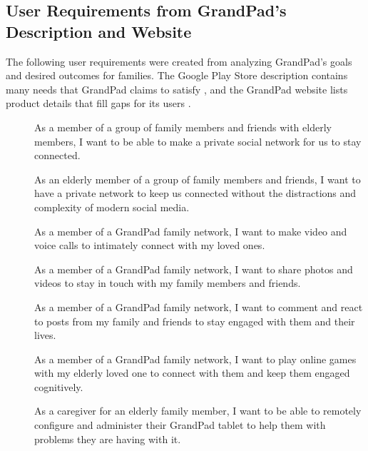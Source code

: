 \subsection*{User Requirements from GrandPad's Description and Website}

The following user requirements were created from analyzing GrandPad's goals and
    desired outcomes for families.
The Google Play Store description contains many needs that GrandPad claims to
    satisfy \cite{grandpad_google_play}, and the GrandPad website lists
    product details that fill gaps for its users \cite{grandpad_product_details}.

\begin{description}
    \item[\textbf{\showusernetcounter}]
        As a member of a group of family members and friends with elderly
            members, I want to be able to make a private social network for us
            to stay connected.
    \item[\textbf{\showusernetcounter}]
        As an elderly member of a group of family members and friends, I want to
            have a private network to keep us connected without the distractions
            and complexity of modern social media.
    \item[\textbf{\showusercallcounter}]
        As a member of a GrandPad family network, I want to make video and voice
            calls to intimately connect with my loved ones.
    \item[\textbf{\showuserpostcounter}]
        As a member of a GrandPad family network, I want to share photos and
            videos to stay in touch with my family members and friends.
    \item[\textbf{\showuserpostcounter}]
        As a member of a GrandPad family network, I want to comment and react to
            posts from my family and friends to stay engaged with them and their
            lives.
    \item[\textbf{\showusergamecounter}]
        As a member of a GrandPad family network, I want to play online games
            with my elderly loved one to connect with them and keep them engaged
            cognitively.
    \item[\textbf{\showusernetcounter}]
        As a caregiver for an elderly family member, I want to be able to
            remotely configure and administer their GrandPad tablet to help them
            with problems they are having with it.
\end{description}

